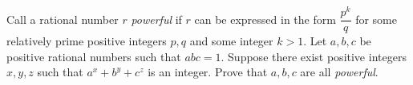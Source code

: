 Call a rational number $r$ \emph{powerful} if $r$ can be expressed in the form $\dfrac{p^k}{q}$ for some relatively prime positive integers $p, q$ and some integer $k >1$. Let $a, b, c$ be positive rational numbers such that $abc = 1$. Suppose there exist positive integers $x, y, z$ such that $a^x + b^y + c^z$ is an integer. Prove that $a, b, c$ are all \emph{powerful}.